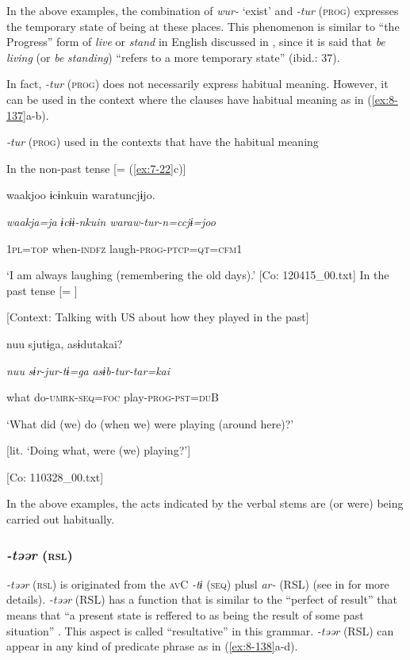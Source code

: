 In the above examples, the combination of \textit{wur-} ‘exist’ and \textit{{}-tur} (\textsc{prog}) expresses the temporary state of being at these places. This phenomenon is similar to “the Progress” form of \textit{live} or \textit{stand} in English discussed in \citet{Comrie1976}, since it is said that \textit{be} \textit{living} (or \textit{be} \textit{standing}) “refers to a more temporary state” (ibid.: 37).

  In fact, \textit{{}-tur} (\textsc{prog}) does not necessarily express habitual meaning. However, it can be used in the context where the clauses have habitual meaning as in (\ref{ex:8-137}a-b).

\ea\label{ex:8-137}
  \textit{{}-tur} (\textsc{prog}) used in the contexts that have the habitual meaning

\ea In the non-past tense [= (\ref{ex:7-22}c)]

    {\TM}
\glll  waakjoo  ɨcɨnkuin  waratuncjɨjo.

      \textit{waakja=ja}  \textit{ɨcɨɨ-nkuin}  \textit{waraw-tur{}-n=ccjɨ=joo}

      1\textsc{pl}=\textsc{top}  when-\textsc{indfz}  laugh-\textsc{prog}-\textsc{ptcp}=\textsc{qt}=\textsc{cfm1}

\glt ‘I am always laughing (remembering the old days).’ [Co: 120415\_00.txt]
\ex In the past tense [= ]

    [Context: Talking with US about how they played in the past]

    {\TM}
\glll  nuu  sjutɨga,  asɨdutakai?

      \textit{nuu}  \textit{sɨr-jur-tɨ=ga}  \textit{asɨb-tur{}-tar=kai}

      what  do-\textsc{umrk}-\textsc{seq}=\textsc{foc}  play-\textsc{prog}-\textsc{pst}=\textsc{du}B

\glt ‘What did (we) do (when we) were playing (around here)?’

[lit. ‘Doing what, were (we) playing?’]

      [Co: 110328\_00.txt]
\z

In the above examples, the acts indicated by the verbal stems are (or were) being carried out habitually.

\subsubsection{\textit{{}-təər} (\textsc{rsl})}

\textit{{}-təər} (\textsc{rsl}) is originated from the \textsc{av}C \textit{{}-tɨ} (\textsc{seq}) plusl \textit{ar-} (RSL) (see  in  for more details). \textit{{}-təər} (RSL) has a function that is similar to the “perfect of result” that means that “a present state is reffered to as being the result of some past situation” \citep[56]{Comrie1976}. This aspect is called “resultative” in this grammar. \textit{{}-təər} (RSL) can appear in any kind of predicate phrase as in (\ref{ex:8-138}a-d).

